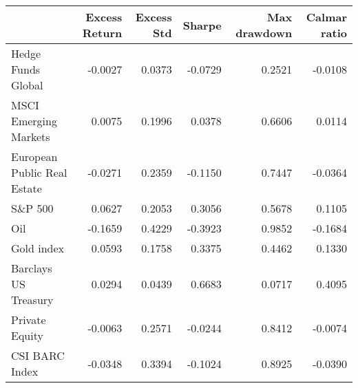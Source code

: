 \begin{tabular}{lrrrrr}
\toprule
{} &  Excess Return &  Excess Std &  Sharpe &  Max drawdown &  Calmar ratio \\
\midrule
Hedge Funds Global          &        -0.0027 &      0.0373 & -0.0729 &        0.2521 &       -0.0108 \\
MSCI Emerging Markets       &         0.0075 &      0.1996 &  0.0378 &        0.6606 &        0.0114 \\
European Public Real Estate &        -0.0271 &      0.2359 & -0.1150 &        0.7447 &       -0.0364 \\
S\&P 500                     &         0.0627 &      0.2053 &  0.3056 &        0.5678 &        0.1105 \\
Oil                         &        -0.1659 &      0.4229 & -0.3923 &        0.9852 &       -0.1684 \\
Gold index                  &         0.0593 &      0.1758 &  0.3375 &        0.4462 &        0.1330 \\
Barclays US Treasury        &         0.0294 &      0.0439 &  0.6683 &        0.0717 &        0.4095 \\
Private Equity              &        -0.0063 &      0.2571 & -0.0244 &        0.8412 &       -0.0074 \\
CSI BARC Index              &        -0.0348 &      0.3394 & -0.1024 &        0.8925 &       -0.0390 \\
\bottomrule
\end{tabular}
